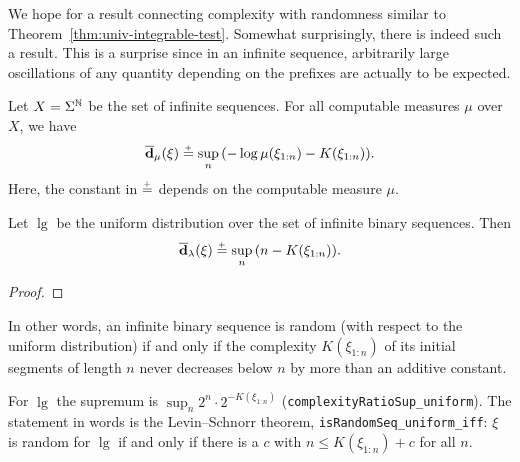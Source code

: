 We hope for a result connecting complexity with randomness similar to
Theorem~\ref{thm:univ-integrable-test}.
Somewhat surprisingly, there is indeed such a result.
This is a surprise since in an infinite sequence, arbitrarily large oscillations
of any quantity depending on the prefixes are actually to be expected.

 \begin{theorem}\label{thm:defic-charac-cpt-seqs}
  \leanok
Let \( X=\Sigma^{\mathbb{N}} \) be the set of infinite sequences.
For all computable measures \( \mu \) over \( X \), we have
 \begin{equation}\label{eq:defic-charac-seq}
 \overline{\mathbf{d}}_{\mu}(\xi) \stackrel{{}_+}{=} \sup_{n}{\left( -\log \mu(\xi_{1:n}) - K(\xi_{1:n})\right)}.
 \end{equation}
Here, the constant in \( \stackrel{{}_+}{=} \) depends on the computable measure \( \mu \).
 \end{theorem}

 \begin{corollary}
  \label{cor:g2.3.30}
  \leanok
Let \( \lg \) be the uniform distribution over the set of infinite binary sequences.
Then
 \begin{equation}
 \overline{\mathbf{d}}_{\lambda}(\xi) \stackrel{{}_+}{=} \sup_{n}{\left( n - K(\xi_{1:n})\right)}.
 \end{equation}
 \end{corollary}
\begin{proof}
  \leanok
\end{proof}
In other words, an infinite binary sequence is random (with respect to the
uniform distribution) if and only if
the complexity \( K(\xi_{1:n}) \) of its initial
segments of length \( n \) never decreases below \( n \) by more than an
additive constant.

\begin{formalization}
For \( \lg \) the supremum is \( \sup_{n} 2^{n} \cdot 2^{-K(\xi_{1:n})} \)
(\texttt{complexityRatioSup\_uniform}). The statement in words is the Levin--Schnorr theorem,
\texttt{isRandomSeq\_uniform\_iff}: \( \xi \) is random for \( \lg \) if and only if there is a
\( c \) with \( n \le K(\xi_{1:n}) + c \) for all \( n \).
\end{formalization}

